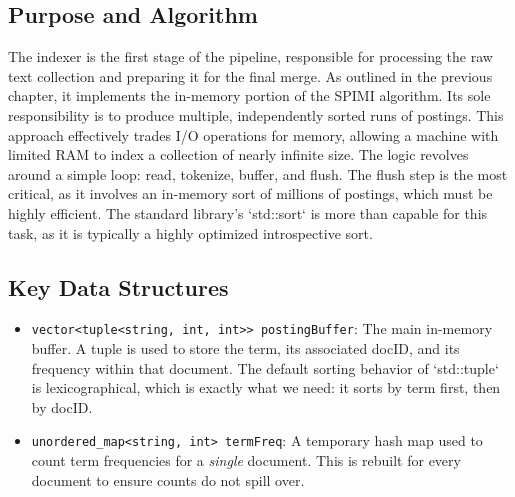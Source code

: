 \documentclass{article}
\begin{document}
\subsection{Purpose and Algorithm}
The indexer is the first stage of the pipeline, responsible for processing the raw text collection and preparing it for the final merge. As outlined in the previous chapter, it implements the in-memory portion of the SPIMI algorithm. Its sole responsibility is to produce multiple, independently sorted runs of postings. This approach effectively trades I/O operations for memory, allowing a machine with limited RAM to index a collection of nearly infinite size. The logic revolves around a simple loop: read, tokenize, buffer, and flush. The flush step is the most critical, as it involves an in-memory sort of millions of postings, which must be highly efficient. The standard library's `std::sort` is more than capable for this task, as it is typically a highly optimized introspective sort.

\subsection{Key Data Structures}
\begin{itemize}
    \item \texttt{vector<tuple<string, int, int>> postingBuffer}: The main in-memory buffer. A tuple is used to store the term, its associated docID, and its frequency within that document. The default sorting behavior of `std::tuple` is lexicographical, which is exactly what we need: it sorts by term first, then by docID.
    \item \texttt{unordered\_map<string, int> termFreq}: A temporary hash map used to count term frequencies for a \textit{single} document. This is rebuilt for every document to ensure counts do not spill over.
\end{itemize}
\end{document}
